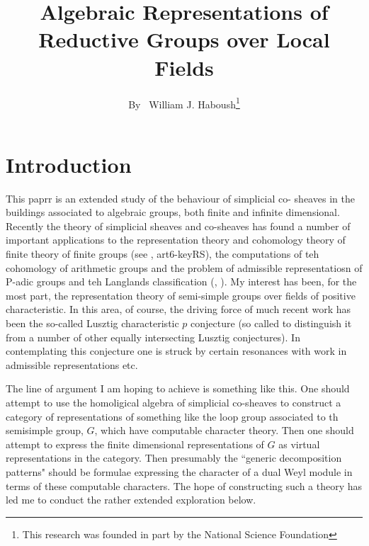 \title{Algebraic Representations of Reductive Groups over Local Fields}

\author{By~ William J. Haboush\footnote{This research was founded in part by the National Science Foundation}}

\date{}
\maketitle



\section*{Introduction}

This paprr is an extended study of the behaviour of simplicial co- sheaves in the buildings associated to algebraic groups, both finite and infinite dimensional. Recently the theory of simplicial sheaves and co-sheaves has found a number of important applications to the representation theory and cohomology theory of finite theory of finite groups (see \cite{art6-keyT}, art6-keyRS), the computations of teh cohomology of arithmetic groups and the problem of admissible representatiosn of P-adic groups and teh Langlands classification (\cite{art6-keyCW}, \cite{art6-keyBW}). My interest has been, for the most part, the representation theory of semi-simple groups over fields of positive characteristic. In this area, of course, the driving force of much recent work has been the so-called Lusztig characteristic $p$ conjecture \cite{art6-keyL1} (so called to distinguish it from a number of other equally intersecting Lusztig conjectures). In contemplating this conjecture one is struck by certain resonances with work in admissible representations etc.

The line of argument I am hoping to achieve is something like this. One should attempt to use the homoligical algebra of simplicial co-sheaves to construct a category of representations of something like the loop group associated to th semisimple group, $G$, which have computable character theory. Then one should attempt to express the finite dimensional representations of $G$ as virtual representations in the category. Then presumably the ``generic decomposition patterns" should be formulae expressing the character of a dual Weyl module in terms of these computable characters. The hope of constructing such a theory has led me to conduct the rather extended exploration below.  

